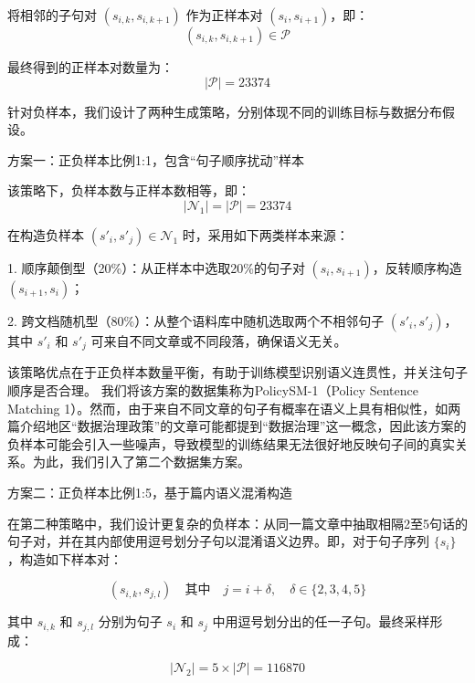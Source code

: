 \documentclass[12pt, a4paper]{ctexart}
\begin{document}
将相邻的子句对 $(s_{i,k}, s_{i,k+1})$ 作为正样本对 $(s_i, s_{i+1})$，即：
\begin{equation}
(s_{i,k}, s_{i,k+1}) \in \mathcal{P}
\end{equation}

最终得到的正样本对数量为：
\begin{equation}
|\mathcal{P}| = 23374
\end{equation}

针对负样本，我们设计了两种生成策略，分别体现不同的训练目标与数据分布假设。

方案一：正负样本比例1:1，包含“句子顺序扰动”样本

该策略下，负样本数与正样本数相等，即：
\begin{equation}
|\mathcal{N}_1| = |\mathcal{P}| = 23374
\end{equation}

在构造负样本 $(s'_i, s'_j) \in \mathcal{N}_1$ 时，采用如下两类样本来源：

1. 顺序颠倒型（20\%）：从正样本中选取20\%的句子对 $(s_i, s_{i+1})$，反转顺序构造 $(s_{i+1}, s_i)$；

2. 跨文档随机型（80\%）：从整个语料库中随机选取两个不相邻句子 $(s'_i, s'_j)$，其中 $s'_i$ 和 $s'_j$ 可来自不同文章或不同段落，确保语义无关。

该策略优点在于正负样本数量平衡，有助于训练模型识别语义连贯性，并关注句子顺序是否合理。
我们将该方案的数据集称为PolicySM-1（Policy Sentence Matching 1）。然而，由于来自不同文章的句子有概率在语义上具有相似性，如两篇介绍地区“数据治理政策”的文章可能都提到“数据治理”这一概念，因此该方案的负样本可能会引入一些噪声，导致模型的训练结果无法很好地反映句子间的真实关系。为此，我们引入了第二个数据集方案。

\vspace{2em} %

方案二：正负样本比例1:5，基于篇内语义混淆构造

在第二种策略中，我们设计更复杂的负样本：从同一篇文章中抽取相隔2至5句话的句子对，并在其内部使用逗号划分子句以混淆语义边界。即，对于句子序列 $\{s_i\}$，构造如下样本对：

\begin{equation}
(s_{i,k}, s_{j,l}) \quad \text{其中} \quad j = i + \delta,\quad \delta \in \{2, 3, 4, 5\}
\end{equation}

其中 $s_{i,k}$ 和 $s_{j,l}$ 分别为句子 $s_i$ 和 $s_j$ 中用逗号划分出的任一子句。最终采样形成：

\begin{equation}
|\mathcal{N}_2| = 5 \times |\mathcal{P}| = 116870
\end{equation}
\end{document}
